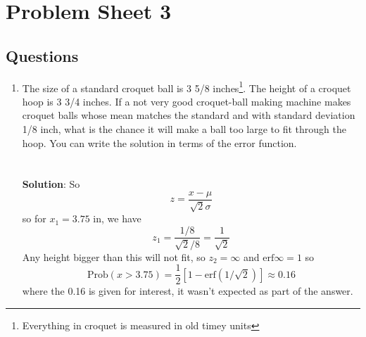 \documentclass[11pt,a4paper]{scrartcl}
\begin{document}
\section*{Problem Sheet 3}



\subsection*{Questions}

\begin{enumerate}

\item The size of a standard croquet ball is 3 5/8
  inches\footnote{Everything in croquet is measured in old timey
    units}. The height of a croquet hoop is 3 3/4 inches. If a not
  very good croquet-ball making machine makes croquet balls whose mean
  matches the standard and with standard deviation 1/8 inch, what is
  the chance it will make a ball too large to fit through the
  hoop. You can write the solution in terms of the error function.
  \\ \\ \\ \textbf{Solution}: So
\begin{equation}
z=\frac{x-\mu}{\sqrt{2}\sigma}
\end{equation}
so for $x_1=3.75$ in, we have
\begin{equation}
z_1=\frac{1/8}{\sqrt{2}/8}=\frac{1}{\sqrt{2}}
\end{equation}
Any height bigger than this will not fit, so $z_2=\infty$ and $\mbox{erf}{\infty}=1$ so
\begin{equation}
\mbox{Prob}(x>3.75)=\frac{1}{2}[1-\mbox{erf}(1/\sqrt{2})]\approx 0.16
\end{equation}
where the 0.16 is given for interest, it wasn't expected as part of the answer.


\end{enumerate}
\end{document}
